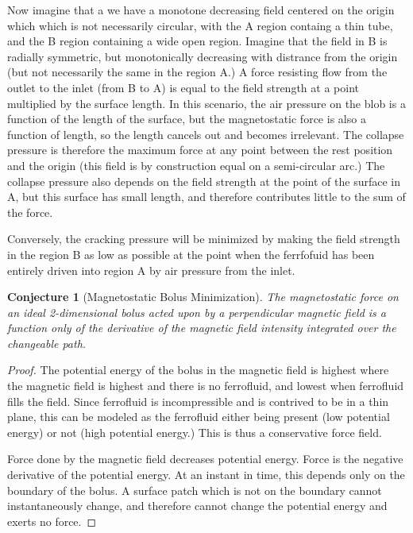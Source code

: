 \documentclass{asme2ej}
\newtheorem{conjecture}{Conjecture}
\begin{document}
Now imagine that a we have a monotone decreasing field centered
on the origin which which is not necessarily circular, with
the A region containg a thin tube, and the B region containing
a wide open region. Imagine that the field in B is radially
symmetric, but monotonically decreasing with distrance from
the origin (but not necessarily the same in the region A.)
A force resisting flow from the outlet to the inlet (from B to A)
is equal to the field strength at a point multiplied by the surface
length.
In this scenario, the air pressure on the blob is a function
of the length of the surface, but the magnetostatic force is
also a function of length, so the length cancels out and becomes
irrelevant.
The collapse pressure is therefore the maximum force at any point between the rest position and the origin
(this field is by construction equal on a semi-circular arc.)
The collapse pressure also depends on the field strength
at the point of the surface in A, but this surface has small length,
and therefore contributes little to the sum of the force.

Conversely, the cracking pressure will be minimized by
making the field strength in the region B as low as possible
at the point when the ferrfofuid has been entirely driven into
region A by air pressure from the inlet.

\begin{conjecture}[Magnetostatic Bolus Minimization]
  \label{conj:mbf}
  The magnetostatic force on an ideal 2-dimensional bolus
  acted upon by a perpendicular magnetic field
  is a function only of the derivative of the magnetic field
  intensity integrated over the changeable path.
\end{conjecture}

\begin{proof}
  The potential energy of the bolus in the magnetic field
  is highest where the magnetic field is highest and there is
  no ferrofluid, and lowest when ferrofluid fills the field.
  Since ferrofluid is incompressible and is
  contrived to be in a thin plane, this can be modeled as the
  ferrofluid either being present (low potential energy) or not
  (high potential energy.) This is thus a conservative force field.

  Force done by the magnetic field decreases potential energy.
  Force is the negative derivative of the potential energy.
  At an instant in time, this depends only on the boundary of the
  bolus. A surface patch which is not on the boundary cannot
  instantaneously change, and therefore cannot change the potential
  energy and exerts no force.
 \end{proof}
\end{document}

